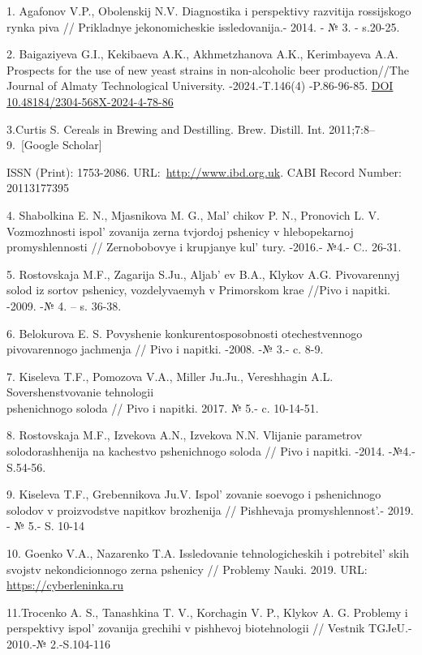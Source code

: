\begin{references}
1. Agafonov V.P., Obolenskij N.V. Diagnostika i perspektivy razvitija
rossijskogo rynka piva // Prikladnye jekonomicheskie issledovanija.-
2014. - № 3. - s.20-25.

2. Baigaziyeva G.I., Kekibaeva A.K., Akhmetzhanova A.K., Kerimbayeva
A.A. Prospects for the use of new yeast strains in non-alcoholic beer
production//The Journal of Almaty Technological University.
-2024.-T.146(4) -P.86-96-85.
\href{https://doi.org/10.48184/2304-568X-2024-4-78-86}{DOI
10.48184/2304-568X-2024-4-78-86}

3.Curtis S. Cereals in Brewing and Destilling. Brew. Distill. Int.
2011;7:8--9.~{[}Google Scholar{]}

ISSN (Print): 1753-2086.
URL:~\href{http://www.ibd.org.uk/}{http://www.ibd.org.uk}. CABI Record
Number: 20113177395

4. Shabolkina E. N., Mjasnikova M. G., Mal' chikov P. N.,
Pronovich L. V. Vozmozhnosti ispol' zovanija zerna
tvjordoj pshenicy v hlebopekarnoj promyshlennosti // Zernobobovye i
krupjanye kul' tury. -2016.- №4.- C.. 26-31.

5. Rostovskaja M.F., Zagarija S.Ju., Aljab' ev B.A.,
Klykov A.G. Pivovarennyj solod iz sortov pshenicy, vozdelyvaemyh v
Primorskom krae //Pivo i napitki. -2009. -№ 4. -- s. 36-38.

6. Belokurova E. S. Povyshenie konkurentosposobnosti otechestvennogo
pivovarennogo jachmenja // Pivo i napitki. -2008. -№ 3.- c. 8-9.

7. Kiseleva T.F., Pomozova V.A., Miller Ju.Ju., Vereshhagin A.L.
Sovershenstvovanie tehnologii \\pshenichnogo soloda // Pivo i napitki.
2017. № 5.- c. 10-14-51.

8. Rostovskaja M.F., Izvekova A.N., Izvekova N.N. Vlijanie parametrov
solodorashhenija na kachestvo pshenichnogo soloda // Pivo i napitki.
-2014. -№4.- S.54-56.

9. Kiseleva T.F., Grebennikova Ju.V. Ispol' zovanie
soevogo i pshenichnogo solodov v proizvodstve napitkov brozhenija //
Pishhevaja promyshlennost'.- 2019. - № 5.- S. 10-14

10. Goenko V.A., Nazarenko T.A. Issledovanie tehnologicheskih i
potrebitel' skih svojstv nekondicionnogo zerna pshenicy
// Problemy Nauki. 2019.
URL: \href{https://cyberleninka.ru/article/n/issledovanie-tehnologicheskih-i-potrebitelskih-svoystv-nekonditsionnogo-zerna-pshenitsy}{https://cyberleninka.ru}

11.Trocenko A. S., Tanashkina T. V., Korchagin V. P., Klykov A. G.
Problemy i perspektivy ispol' zovanija grechihi v
pishhevoj biotehnologii // Vestnik TGJeU.- 2010.-№ 2.-S.104-116


\end{references}
